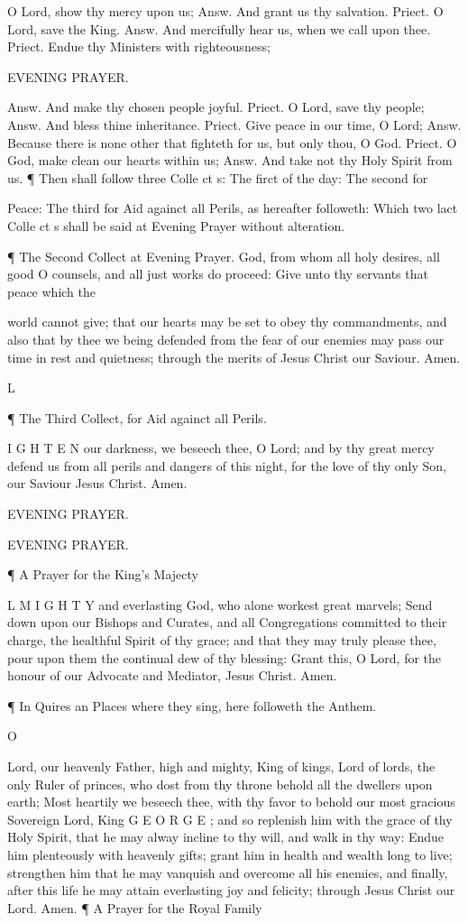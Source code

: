 O Lord, show thy mercy upon us; Answ. And grant us thy salvation. Priect. O Lord, save the King. Answ. And mercifully hear us, when we call upon thee. Priect. Endue thy Ministers with righteousness;

EVENING PRAYER.

Answ. And make thy chosen people joyful. Priect. O Lord, save thy people; Answ. And bless thine inheritance. Priect. Give peace in our time, O Lord; Answ. Because there is none other that fighteth for us, but only thou, O God. Priect. O God, make clean our hearts within us; Answ. And take not thy Holy Spirit from us. ¶ Then shall follow three Colle ct s: The firct of the day: The second for

Peace: The third for Aid againct all Perils, as hereafter followeth: Which two lact Colle ct s shall be said at Evening Prayer without alteration.

¶ The Second Collect at Evening Prayer. God, from whom all holy desires, all good O counsels, and all just works do proceed: Give unto thy servants that peace which the

world cannot give; that our hearts may be set to obey thy commandments, and also that by thee we being defended from the fear of our enemies may pass our time in rest and quietness; through the merits of Jesus Christ our Saviour. Amen.

L

¶ The Third Collect, for Aid againct all Perils.

I G H T E N our darkness, we beseech thee, O Lord; and by thy great mercy defend us from all perils and dangers of this night, for the love of thy only Son, our Saviour Jesus Christ. Amen.

EVENING PRAYER.

EVENING PRAYER.

¶ A Prayer for the King’s Majecty

L M I G H T Y and everlasting God, who alone workest great marvels; Send down upon our Bishops and Curates, and all Congregations committed to their charge, the healthful Spirit of thy grace; and that they may truly please thee, pour upon them the continual dew of thy blessing: Grant this, O Lord, for the honour of our Advocate and Mediator, Jesus Christ. Amen.

¶ In Quires an Places where they sing, here followeth the Anthem.

O

Lord, our heavenly Father, high and mighty, King of kings, Lord of lords, the only Ruler of princes, who dost from thy throne behold all the dwellers upon earth; Most heartily we beseech thee, with thy favor to behold our most gracious Sovereign Lord, King G E O R G E ; and so replenish him with the grace of thy Holy Spirit, that he may alway incline to thy will, and walk in thy way: Endue him plenteously with heavenly gifts; grant him in health and wealth long to live; strengthen him that he may vanquish and overcome all his enemies, and finally, after this life he may attain everlasting joy and felicity; through Jesus Christ our Lord. Amen. ¶ A Prayer for the Royal Family

